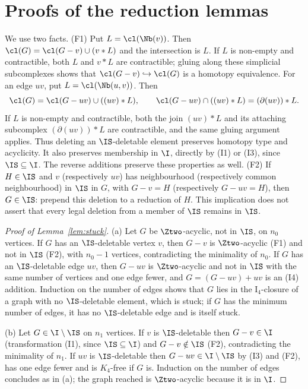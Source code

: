 \section{Proofs of the reduction lemmas}\label{app:proofs}

We use two facts. (F1) Put $L=\cl(\Nb(v))$. Then $\cl(G)=\cl(G-v)\cup(v*L)$ and the intersection is $L$. If $L$ is non-empty and contractible, both $L$ and $v*L$ are contractible; gluing along these simplicial subcomplexes shows that $\cl(G-v)\hookrightarrow\cl(G)$ is a homotopy equivalence. For an edge $uv$, put $L=\cl(\Nb(u,v))$. Then
\[
\cl(G)=\cl(G-uv)\cup((uv)*L),\qquad
\cl(G-uv)\cap((uv)*L)=(\partial(uv))*L.
\]
If $L$ is non-empty and contractible, both the join $(uv)*L$ and its attaching subcomplex $(\partial(uv))*L$ are contractible, and the same gluing argument applies. Thus deleting an $\IS$-deletable element preserves homotopy type and acyclicity. It also preserves membership in $\I$, directly by (I1) or (I3), since $\IS\subseteq\I$. The reverse additions preserve these properties as well. (F2) If $H\in\IS$ and $v$ (respectively $uv$) has neighbourhood (respectively common neighbourhood) in $\IS$ in $G$, with $G-v=H$ (respectively $G-uv=H$), then $G\in\IS$: prepend this deletion to a reduction of $H$. This implication does not assert that every legal deletion from a member of $\IS$ remains in $\IS$.

\begin{proof}[Proof of Lemma~\ref{lem:stuck}]
(a) Let $G$ be $\Ztwo$-acyclic, not in $\IS$, on $n_0$ vertices. If $G$ has an $\IS$-deletable vertex $v$, then $G-v$ is $\Ztwo$-acyclic (F1) and not in $\IS$ (F2), with $n_0-1$ vertices, contradicting the minimality of $n_0$. If $G$ has an $\IS$-deletable edge $uv$, then $G-uv$ is $\Ztwo$-acyclic and not in $\IS$ with the same number of vertices and one edge fewer, and $G=(G-uv)+uv$ is an (I4) addition. Induction on the number of edges shows that $G$ lies in the $\mathrm{I}_4$-closure of a graph with no $\IS$-deletable element, which is stuck; if $G$ has the minimum number of edges, it has no $\IS$-deletable edge and is itself stuck.

(b) Let $G\in\I\setminus\IS$ on $n_1$ vertices. If $v$ is $\IS$-deletable then $G-v\in\I$ (transformation (I1), since $\IS\subseteq\I$) and $G-v\notin\IS$ (F2), contradicting the minimality of $n_1$. If $uv$ is $\IS$-deletable then $G-uv\in\I\setminus\IS$ by (I3) and (F2), has one edge fewer and is $K_4$-free if $G$ is. Induction on the number of edges concludes as in (a); the graph reached is $\Ztwo$-acyclic because it is in $\I$.
\end{proof}

